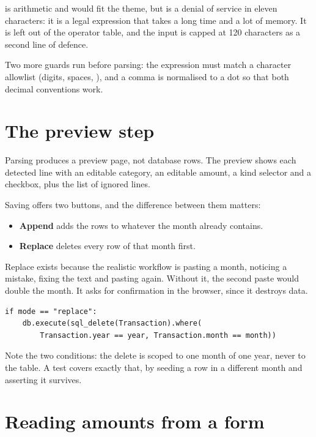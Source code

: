 \begin{pitfall}
\code{**} is arithmetic and would fit the theme, but  is a
denial of service in eleven characters: it is a legal expression that takes a
long time and a lot of memory. It is left out of the operator table, and the
input is capped at 120 characters as a second line of defence.
\end{pitfall}

Two more guards run before parsing: the expression must match a character
allowlist (digits, spaces, ), and a comma is normalised
to a dot so that both decimal conventions work.

\section{The preview step}

Parsing produces a preview page, not database rows. The preview shows each
detected line with an editable category, an editable amount, a kind selector and
a checkbox, plus the list of ignored lines.

Saving offers two buttons, and the difference between them matters:

\begin{itemize}
  \item \textbf{Append} adds the rows to whatever the month already contains.
  \item \textbf{Replace} deletes every row of that month first.
\end{itemize}

Replace exists because the realistic workflow is pasting a month, noticing a
mistake, fixing the text and pasting again. Without it, the second paste would
double the month. It asks for confirmation in the browser, since it destroys
data.

\begin{lstlisting}[style=py]
if mode == "replace":
    db.execute(sql_delete(Transaction).where(
        Transaction.year == year, Transaction.month == month))
\end{lstlisting}

Note the two conditions: the delete is scoped to one month of one year, never to
the table. A test covers exactly that, by seeding a row in a different month and
asserting it survives.

\section{Reading amounts from a form}

